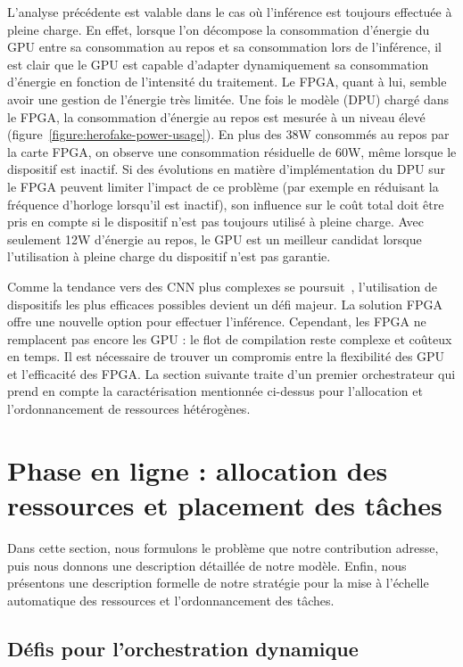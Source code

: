 L'analyse précédente est valable dans le cas où l'inférence est toujours effectuée à pleine charge. En effet, lorsque l'on décompose la consommation d'énergie du GPU entre sa consommation au repos et sa consommation lors de l'inférence, il est clair que le GPU est capable d'adapter dynamiquement sa consommation d'énergie en fonction de l'intensité du traitement. Le FPGA, quant à lui, semble avoir une gestion de l'énergie très limitée. Une fois le modèle (DPU) chargé dans le FPGA, la consommation d'énergie au repos est mesurée à un niveau élevé (figure~\ref{figure:herofake-power-usage}). En plus des 38W consommés au repos par la carte FPGA, on observe une consommation résiduelle de 60W, même lorsque le dispositif est inactif. Si des évolutions en matière d'implémentation du DPU sur le FPGA peuvent limiter l'impact de ce problème (par exemple en réduisant la fréquence d'horloge lorsqu'il est inactif), son influence sur le coût total doit être pris en compte si le dispositif n'est pas toujours utilisé à pleine charge. Avec seulement 12W d'énergie au repos, le GPU est un meilleur candidat lorsque l'utilisation à pleine charge du dispositif n'est pas garantie.

Comme la tendance vers des CNN plus complexes se poursuit~\cite{8807741}, l'utilisation de dispositifs les plus efficaces possibles devient un défi majeur. La solution FPGA offre une nouvelle option pour effectuer l'inférence. Cependant, les FPGA ne remplacent pas encore les GPU : le flot de compilation reste complexe et coûteux en temps. Il est nécessaire de trouver un compromis entre la flexibilité des GPU et l'efficacité des FPGA. La section suivante traite d'un premier orchestrateur qui prend en compte la caractérisation mentionnée ci-dessus pour l'allocation et l'ordonnancement de ressources hétérogènes.

\section{Phase en ligne : allocation des ressources et placement des tâches}
\label{section:herofake-online}

Dans cette section, nous formulons le problème que notre contribution adresse, puis nous donnons une description détaillée de notre modèle. Enfin, nous présentons une description formelle de notre stratégie pour la mise à l'échelle automatique des ressources et l'ordonnancement des tâches.

\subsection{Défis pour l'orchestration dynamique}

